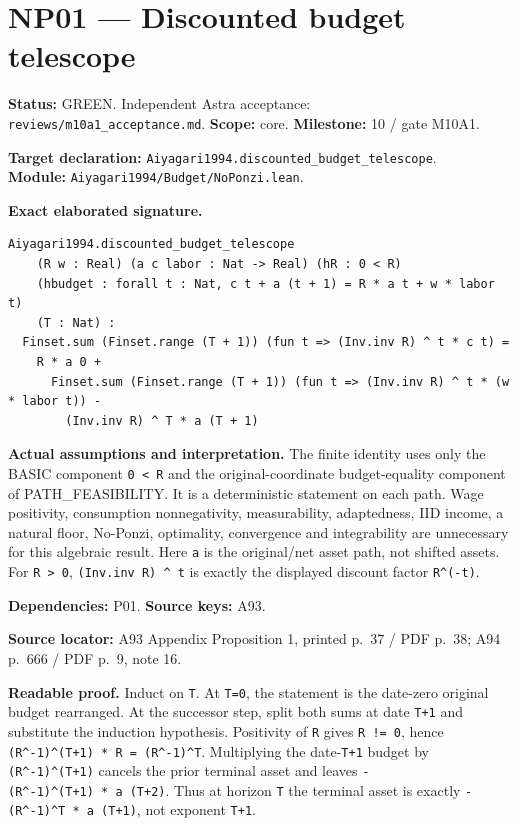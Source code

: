\documentclass[
  11pt,
]{article}
\let\LedgerOriginalTexttt\texttt
\renewcommand{\texttt}[1]{{\small\LedgerOriginalTexttt{#1}}}
\begin{document}
\section{NP01 --- Discounted budget
telescope}\label{np01-discounted-budget-telescope}

\textbf{Status:} GREEN. Independent Astra acceptance:
\texttt{reviews/m10a1\_acceptance.md}. \textbf{Scope:} core.
\textbf{Milestone:} 10 / gate M10A1.

\textbf{Target declaration:}
\texttt{Aiyagari1994.discounted\_budget\_telescope}.\\
\textbf{Module:} \texttt{Aiyagari1994/Budget/NoPonzi.lean}.

\textbf{Exact elaborated signature.}

\begin{verbatim}
Aiyagari1994.discounted_budget_telescope
    (R w : Real) (a c labor : Nat -> Real) (hR : 0 < R)
    (hbudget : forall t : Nat, c t + a (t + 1) = R * a t + w * labor t)
    (T : Nat) :
  Finset.sum (Finset.range (T + 1)) (fun t => (Inv.inv R) ^ t * c t) =
    R * a 0 +
      Finset.sum (Finset.range (T + 1)) (fun t => (Inv.inv R) ^ t * (w * labor t)) -
        (Inv.inv R) ^ T * a (T + 1)
\end{verbatim}

\textbf{Actual assumptions and interpretation.} The finite identity uses
only the BASIC component \texttt{0\ \textless{}\ R} and the
original-coordinate budget-equality component of PATH\_FEASIBILITY. It
is a deterministic statement on each path. Wage positivity, consumption
nonnegativity, measurability, adaptedness, IID income, a natural floor,
No-Ponzi, optimality, convergence and integrability are unnecessary for
this algebraic result. Here \texttt{a} is the original/net asset path,
not shifted assets. For \texttt{R\ \textgreater{}\ 0},
\texttt{(Inv.inv\ R)\ \^{}\ t} is exactly the displayed discount factor
\texttt{R\^{}(-t)}.

\textbf{Dependencies:} P01. \textbf{Source keys:} A93.

\textbf{Source locator:} A93 Appendix Proposition 1, printed p.~37 / PDF
p.~38; A94 p.~666 / PDF p.~9, note 16.

\textbf{Readable proof.} Induct on \texttt{T}. At \texttt{T=0}, the
statement is the date-zero original budget rearranged. At the successor
step, split both sums at date \texttt{T+1} and substitute the induction
hypothesis. Positivity of \texttt{R} gives \texttt{R\ !=\ 0}, hence
\texttt{(R\^{}-1)\^{}(T+1)\ *\ R\ =\ (R\^{}-1)\^{}T}. Multiplying the
date-\texttt{T+1} budget by \texttt{(R\^{}-1)\^{}(T+1)} cancels the
prior terminal asset and leaves
\texttt{-(R\^{}-1)\^{}(T+1)\ *\ a\ (T+2)}. Thus at horizon \texttt{T}
the terminal asset is exactly \texttt{-(R\^{}-1)\^{}T\ *\ a\ (T+1)}, not
exponent \texttt{T+1}.
\end{document}
